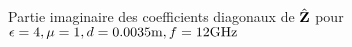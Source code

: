   \begin{figure}[!hbt]
    \centering
    
    \caption[Reproduction résultat P. Soudais p.~11]{Partie imaginaire des coefficients diagonaux de \(\hat{\mathbf{Z}}\) pour \(\epsilon = 4, \mu = 1, d=0.0035\text{m}, f=12\text{GHz}\)}
    \label{fig:imp_fourier:plan:soudais}
  \end{figure}



\FloatBarrier
